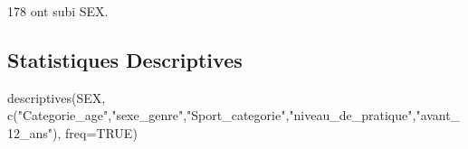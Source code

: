 \documentclass[
]{article}
\newenvironment{Shaded}{\begin{snugshade}}{\end{snugshade}}
\newcommand{\AttributeTok}[1]{\textcolor[rgb]{0.77,0.63,0.00}{#1}}
\newcommand{\ConstantTok}[1]{\textcolor[rgb]{0.00,0.00,0.00}{#1}}
\newcommand{\DecValTok}[1]{\textcolor[rgb]{0.00,0.00,0.81}{#1}}
\newcommand{\FunctionTok}[1]{\textcolor[rgb]{0.00,0.00,0.00}{#1}}
\newcommand{\NormalTok}[1]{#1}
\newcommand{\OtherTok}[1]{\textcolor[rgb]{0.56,0.35,0.01}{#1}}
\newcommand{\SpecialCharTok}[1]{\textcolor[rgb]{0.00,0.00,0.00}{#1}}
\newcommand{\StringTok}[1]{\textcolor[rgb]{0.31,0.60,0.02}{#1}}
\begin{document}
\begin{Shaded}
\end{Shaded}

178 ont subi SEX.

\hypertarget{statistiques-descriptives-3}{%
\subsection{Statistiques
Descriptives}\label{statistiques-descriptives-3}}

\begin{Shaded}
\begin{Highlighting}[]
\FunctionTok{descriptives}\NormalTok{(SEX, }\FunctionTok{c}\NormalTok{(}\StringTok{"Categorie\_age"}\NormalTok{,}\StringTok{"sexe\_genre"}\NormalTok{,}\StringTok{"Sport\_categorie"}\NormalTok{,}\StringTok{"niveau\_de\_pratique"}\NormalTok{,}\StringTok{"avant\_12\_ans"}\NormalTok{), }
             \AttributeTok{freq=}\ConstantTok{TRUE}\NormalTok{)}
\end{Highlighting}
\end{Shaded}
\end{document}
